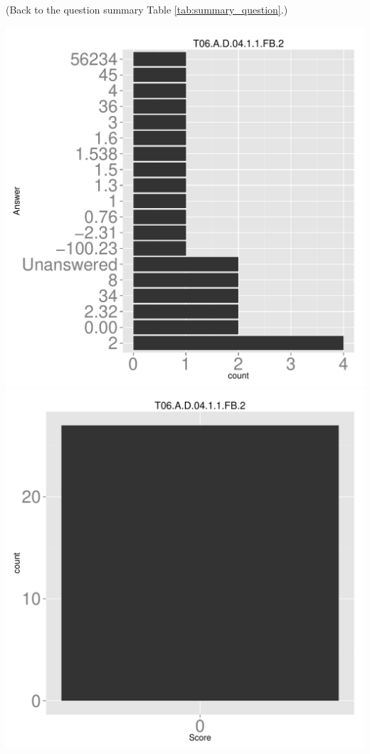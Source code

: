 \documentclass[12pt,nohyper]{tufte-handout}\usepackage[]{graphicx}\usepackage[]{color}
\begin{document}
 (Back to the question summary Table \ref{tab:summary_question}.)

\begin{center} \includegraphics[width=.45\linewidth]{Topic06_14_answer} \includegraphics[width=.45\linewidth]{Topic06_14_score} \end{center} 
\end{document}
